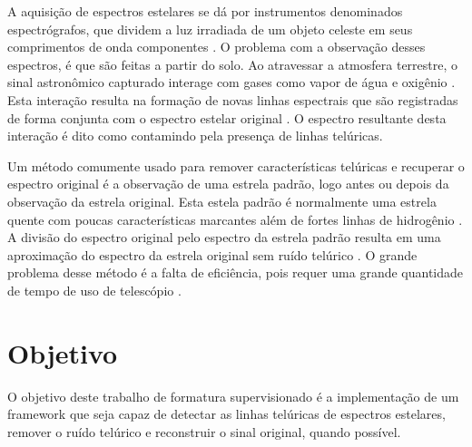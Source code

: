 \documentclass[11pt,twoside,a4paper]{article}
\begin{document}


\par A aquisição de espectros estelares se dá por instrumentos denominados espectrógrafos, que dividem a luz irradiada de um objeto celeste em seus comprimentos de onda componentes \cite{spectrograph_aus}. O problema com a observação desses espectros, é que são feitas a partir do solo. Ao atravessar a atmosfera terrestre, o sinal astronômico capturado interage com gases como vapor de água e oxigênio \cite{astro_sci}. Esta interação resulta na formação de novas linhas espectrais que são registradas de forma conjunta com o espectro estelar original \cite{harvard_atlas}. O espectro resultante desta interação é dito como contamindo pela presença de linhas telúricas. 

\par Um método comumente usado para remover características telúricas e recuperar o espectro original é a observação de uma estrela padrão, logo antes ou depois da observação da estrela original. Esta estela padrão é normalmente uma estrela quente com poucas características marcantes além de fortes linhas de hidrogênio \cite{astro_sci}. A divisão do espectro original pelo espectro da estrela padrão resulta em uma aproximação do espectro da estrela original sem ruído telúrico \cite{model_tel_line}. O grande problema desse método é a falta de eficiência, pois requer uma grande quantidade de tempo de uso de telescópio \cite{astro_sci}.
\section{Objetivo}
\doublespacing
O objetivo deste trabalho de formatura supervisionado é a implementação  de um framework que seja capaz de detectar as linhas telúricas de espectros estelares, remover o ruído telúrico e reconstruir o sinal original, quando possível. 

\end{document}

